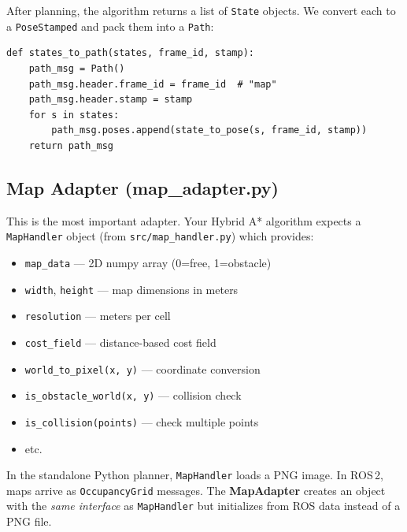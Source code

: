 \documentclass[12pt, a4paper]{article}
\begin{document}
After planning, the algorithm returns a list of \texttt{State} objects.
We convert each to a \texttt{PoseStamped} and pack them into a \texttt{Path}:

\begin{lstlisting}[style=python, caption={Converting algorithm output to a ROS Path}]
def states_to_path(states, frame_id, stamp):
    path_msg = Path()
    path_msg.header.frame_id = frame_id  # "map"
    path_msg.header.stamp = stamp
    for s in states:
        path_msg.poses.append(state_to_pose(s, frame_id, stamp))
    return path_msg
\end{lstlisting}

\subsection{Map Adapter (map\_adapter.py)}
\label{sec:mapadapter}

This is the most important adapter. Your Hybrid A* algorithm expects a
\texttt{MapHandler} object (from \texttt{src/map\_handler.py}) which provides:
\begin{itemize}[nosep]
    \item \texttt{map\_data} --- 2D numpy array (0=free, 1=obstacle)
    \item \texttt{width}, \texttt{height} --- map dimensions in meters
    \item \texttt{resolution} --- meters per cell
    \item \texttt{cost\_field} --- distance-based cost field
    \item \texttt{world\_to\_pixel(x, y)} --- coordinate conversion
    \item \texttt{is\_obstacle\_world(x, y)} --- collision check
    \item \texttt{is\_collision(points)} --- check multiple points
    \item etc.
\end{itemize}

In the standalone Python planner, \texttt{MapHandler} loads a PNG image.
In ROS\,2, maps arrive as \texttt{OccupancyGrid} messages. The \textbf{MapAdapter}
creates an object with the \emph{same interface} as \texttt{MapHandler}
but initializes from ROS data instead of a PNG file.
\end{document}
